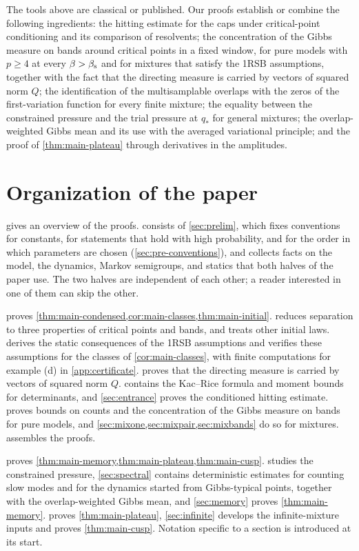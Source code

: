 The tools above are classical or published. Our proofs establish or combine the following ingredients: the hitting estimate for the caps under critical-point conditioning and its comparison of resolvents; the concentration of the Gibbs measure on bands around critical points in a fixed window, for pure models with $p\ge4$ at every $\beta>\beta_{\mathrm s}$ and for mixtures that satisfy the 1RSB assumptions, together with the fact that the directing measure is carried by vectors of squared norm $Q$; the identification of the multisamplable overlaps with the zeros of the first-variation function for every finite mixture; the equality between the constrained pressure and the trial pressure at $q_*$ for general mixtures; the overlap-weighted Gibbs mean and its use with the averaged variational principle; and the proof of \cref{thm:main-plateau} through derivatives in the amplitudes.

\section{Organization of the paper}\label{sec:intro-organization}

 gives an overview of the proofs.  consists of \cref{sec:prelim}, which fixes conventions for constants, for statements that hold with high probability, and for the order in which parameters are chosen (\cref{sec:pre-conventions}), and collects facts on the model, the dynamics, Markov semigroups, and statics that both halves of the paper use. The two halves are independent of each other; a reader interested in one of them can skip the other.

 proves \cref{thm:main-condensed,cor:main-classes,thm:main-initial}.  reduces separation to three properties of critical points and bands, and treats other initial laws.  derives the static consequences of the 1RSB assumptions and verifies these assumptions for the classes of \cref{cor:main-classes}, with finite computations for example (d) in \cref{app:certificate}.  proves that the directing measure is carried by vectors of squared norm $Q$.  contains the Kac--Rice formula and moment bounds for determinants, and \cref{sec:entrance} proves the conditioned hitting estimate.  proves bounds on counts and the concentration of the Gibbs measure on bands for pure models, and \cref{sec:mixone,sec:mixpair,sec:mixbands} do so for mixtures.  assembles the proofs.

 proves \cref{thm:main-memory,thm:main-plateau,thm:main-cusp}.  studies the constrained pressure, \cref{sec:spectral} contains deterministic estimates for counting slow modes and for the dynamics started from Gibbs-typical points, together with the overlap-weighted Gibbs mean, and \cref{sec:memory} proves \cref{thm:main-memory}.  proves \cref{thm:main-plateau}, \cref{sec:infinite} develops the infinite-mixture inputs and proves \cref{thm:main-cusp}. Notation specific to a section is introduced at its start.
